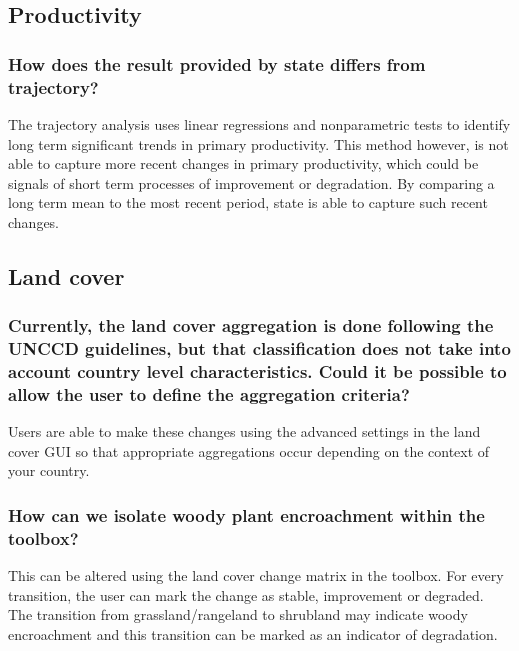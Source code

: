 \documentclass[letterpaper,10pt,english]{sphinxmanual}
\begin{document}
\subsection{Productivity}
\label{\detokenize{Introduction/faq:productivity}}

\subsubsection{How does the result provided by state differs from trajectory?}
\label{\detokenize{Introduction/faq:how-does-the-result-provided-by-state-differs-from-trajectory}}
\sphinxAtStartPar
The trajectory analysis uses linear regressions and non\sphinxhyphen{}parametric tests to
identify long term significant trends in primary productivity. This method
however, is not able to capture more recent changes in primary productivity,
which could be signals of short term processes of improvement or degradation.
By comparing a long term mean to the most recent period, state is able to
capture such recent changes.


\subsection{Land cover}
\label{\detokenize{Introduction/faq:land-cover}}

\subsubsection{Currently, the land cover aggregation is done following the UNCCD guidelines, but that classification does not take into account country level characteristics. Could it be possible to allow the user to define the aggregation criteria?}
\label{\detokenize{Introduction/faq:currently-the-land-cover-aggregation-is-done-following-the-unccd-guidelines-but-that-classification-does-not-take-into-account-country-level-characteristics-could-it-be-possible-to-allow-the-user-to-define-the-aggregation-criteria}}
\sphinxAtStartPar
Users are able to make these changes using the advanced settings in the land
cover GUI so that appropriate aggregations occur depending on the context of
your country.


\subsubsection{How can we isolate woody plant encroachment within the toolbox?}
\label{\detokenize{Introduction/faq:how-can-we-isolate-woody-plant-encroachment-within-the-toolbox}}
\sphinxAtStartPar
This can be altered using the land cover change matrix in the toolbox. For
every transition, the user can mark the change as stable, improvement or
degraded. The transition from grassland/rangeland to shrubland may indicate
woody encroachment and this transition can be marked as an indicator of
degradation.
\end{document}
